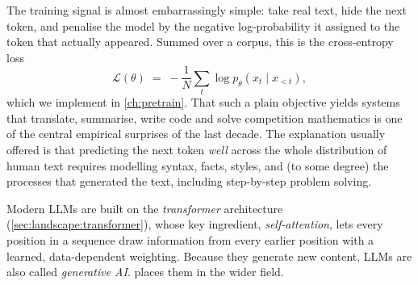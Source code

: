 The training signal is almost embarrassingly simple: take real text, hide the next token, and penalise
the model by the negative log-probability it assigned to the token that actually appeared. Summed over a
corpus, this is the cross-entropy loss
\begin{equation}
\mathcal{L}(\theta) \;=\; -\frac{1}{N}\sum_{t} \log p_\theta(x_t \mid x_{<t}),
\label{eq:landscape:nll}
\end{equation}
which we implement in \cref{ch:pretrain}. That such a plain objective yields systems that translate,
summarise, write code and solve competition mathematics is one of the central empirical surprises of
the last decade. The explanation usually offered is that predicting the next token \emph{well} across
the whole distribution of human text requires modelling syntax, facts, styles, and (to some degree)
the processes that generated the text, including step-by-step problem solving.

Modern LLMs are built on the \emph{transformer} architecture (\cref{sec:landscape:transformer}),
whose key ingredient, \emph{self-attention}, lets every position in a sequence draw information from
every earlier position with a learned, data-dependent weighting. Because they generate new content,
LLMs are also called \emph{generative AI}.  places them in the wider field.

